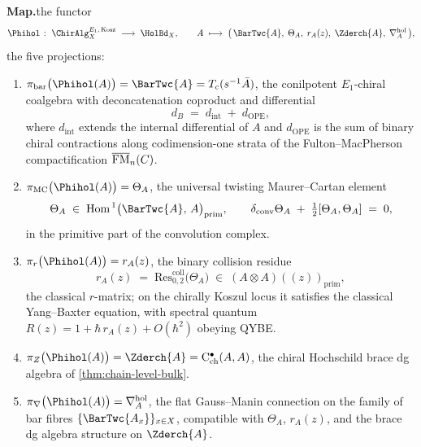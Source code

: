 \begin{theorem}
\noindent\textbf{Map.}\enspace the functor
\begin{equation}\label{eq:typed-hol-functor}
\Phihol \;\colon\; \ChirAlg_{X}^{E_{1},\,\mathrm{Kosz}}
\;\longrightarrow\; \HolBd_{X},
\qquad
A \;\longmapsto\;
\bigl(\,\BarTwc{A},\;\Theta_{A},\;r_{A}(z),\;\Zderch{A},\;\nabla^{\mathrm{hol}}_{A}\,\bigr),
\end{equation}
the five projections:
\begin{enumerate}[label=\textup{(\roman*)}]
\item $\pi_{\mathrm{bar}}\bigl(\Phihol(A)\bigr) = \BarTwc{A} =
T_{c}(s^{-1}\bar{A})$, the conilpotent $E_{1}$-chiral coalgebra with
deconcatenation coproduct and differential
\[
 d_{B} \;=\; d_{\mathrm{int}} \;+\; d_{\mathrm{OPE}},
\]
where $d_{\mathrm{int}}$ extends the internal differential of $A$ and
$d_{\mathrm{OPE}}$ is the sum of binary chiral contractions along
codimension-one strata of the Fulton--MacPherson compactification
$\overline{\mathrm{FM}}_{n}(C)$.
\item $\pi_{\mathrm{MC}}\bigl(\Phihol(A)\bigr) = \Theta_{A}$, the
universal twisting Maurer--Cartan element
\[
 \Theta_{A} \;\in\;
 \mathrm{Hom}^{\,1}\bigl(\BarTwc{A},\,A\bigr)_{\mathrm{prim}},
 \qquad
 \delta_{\mathrm{conv}}\Theta_{A} \;+\; \tfrac{1}{2}[\Theta_{A},\Theta_{A}]
 \;=\; 0,
\]
in the primitive part of the convolution complex.
\item $\pi_{r}\bigl(\Phihol(A)\bigr) = r_{A}(z)$, the binary collision
residue
\[
 r_{A}(z) \;=\;
 \mathrm{Res}^{\mathrm{coll}}_{0,2}\bigl(\Theta_{A}\bigr)
 \;\in\; (A \otimes A)((z))_{\mathrm{prim}},
\]
the classical $r$-matrix; on the chirally Koszul locus it satisfies
the classical Yang--Baxter equation, with spectral quantum
$R(z) = 1 + \hbar\,r_{A}(z) + O(\hbar^{2})$ obeying QYBE.
\item $\pi_{Z}\bigl(\Phihol(A)\bigr) = \Zderch{A} =
\mathrm{C}^{\bullet}_{\mathrm{ch}}(A,A)$, the chiral Hochschild brace
dg algebra of \cref{thm:chain-level-bulk}.
\item $\pi_{\nabla}\bigl(\Phihol(A)\bigr) = \nabla^{\mathrm{hol}}_{A}$,
the flat Gauss--Manin connection on the family of bar fibres
$\{\BarTwc{A_{x}}\}_{x \in X}$, compatible with $\Theta_{A}$,
$r_{A}(z)$, and the brace dg algebra structure on $\Zderch{A}$.
\end{enumerate}


\end{theorem}
